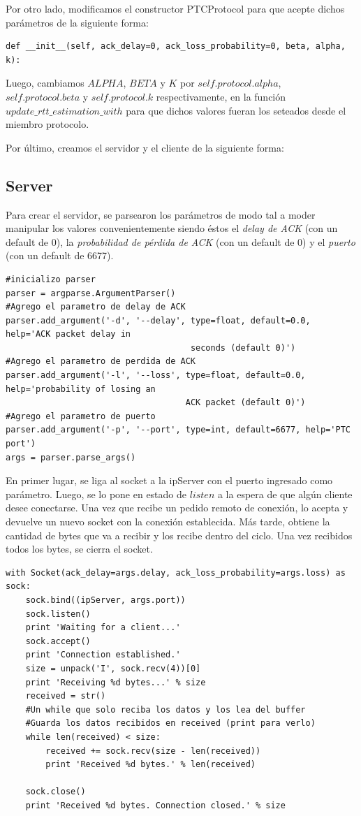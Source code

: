 \documentclass[10pt, a4paper]{article}
\begin{document}
Por otro lado, modificamos el constructor PTCProtocol para que acepte dichos parámetros de la siguiente forma:
\begin{verbatim}
def __init__(self, ack_delay=0, ack_loss_probability=0, beta, alpha, k):
\end{verbatim}

Luego, cambiamos $ALPHA$, $BETA$ y $K$ por $self.protocol.alpha$, $self.protocol.beta$ y $self.protocol.k$ respectivamente, en la función $update\_rtt\_estimation\_with$ para que dichos valores fueran los seteados desde el miembro protocolo.

Por último, creamos el servidor y el cliente de la siguiente forma:

\subsection{Server}

Para crear el servidor, se parsearon los parámetros de modo tal a moder manipular los valores convenientemente siendo éstos el \textit{delay de ACK} (con un default de 0), la \textit{probabilidad de pérdida de ACK} (con un default de 0) y el \textit{puerto} (con un default de 6677).

\begin{verbatim}
#inicializo parser
parser = argparse.ArgumentParser()
#Agrego el parametro de delay de ACK
parser.add_argument('-d', '--delay', type=float, default=0.0, help='ACK packet delay in
									 seconds (default 0)')
#Agrego el parametro de perdida de ACK
parser.add_argument('-l', '--loss', type=float, default=0.0, help='probability of losing an 
									ACK packet (default 0)')
#Agrego el parametro de puerto
parser.add_argument('-p', '--port', type=int, default=6677, help='PTC port')
args = parser.parse_args()
\end{verbatim}

En primer lugar, se liga al socket a la ipServer con el puerto ingresado como parámetro. Luego, se lo pone en estado de $listen$ a la espera de que algún cliente desee conectarse. Una vez que recibe un pedido remoto de conexión, lo acepta y devuelve un nuevo socket con la conexión establecida. Más tarde, obtiene la cantidad de bytes que va a recibir y los recibe dentro del ciclo. Una vez recibidos todos los bytes, se cierra el socket.

\begin{verbatim}
with Socket(ack_delay=args.delay, ack_loss_probability=args.loss) as sock:
    sock.bind((ipServer, args.port))
    sock.listen()
    print 'Waiting for a client...'
    sock.accept()
    print 'Connection established.'
    size = unpack('I', sock.recv(4))[0]
    print 'Receiving %d bytes...' % size
    received = str()
    #Un while que solo reciba los datos y los lea del buffer
    #Guarda los datos recibidos en received (print para verlo)
    while len(received) < size:
        received += sock.recv(size - len(received))
        print 'Received %d bytes.' % len(received)

    sock.close()
    print 'Received %d bytes. Connection closed.' % size
\end{verbatim}
\end{document}
